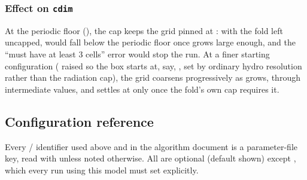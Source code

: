 \subsubsection{Effect on \texttt{cdim}}

At the periodic floor
(), the cap keeps the grid pinned at
: with the fold left uncapped,  would fall
below the periodic floor once  grows large enough, and
the ``must have at least 3 cells'' error would stop the run. At a finer
starting configuration ( raised so the box
starts at, say, , set by ordinary hydro resolution
rather than the radiation cap), the grid coarsens progressively as
 grows, through intermediate  values, and
settles at  only once the fold's own cap requires it.

\subsection{Configuration reference}
\label{sec:config-reference}

Every / identifier used above and in
the algorithm document is a parameter-file key, read with
 unless noted otherwise. All are
optional (default shown) except
, which every run using this
model must set explicitly.

